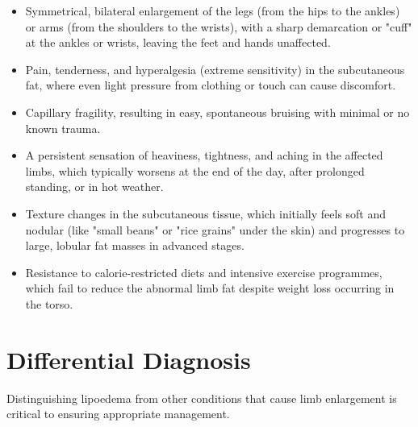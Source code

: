\begin{itemize}
    \item Symmetrical, bilateral enlargement of the legs (from the hips to the ankles) or arms (from the shoulders to the wrists), with a sharp demarcation or "cuff" at the ankles or wrists, leaving the feet and hands unaffected.
    \item Pain, tenderness, and hyperalgesia (extreme sensitivity) in the subcutaneous fat, where even light pressure from clothing or touch can cause discomfort.
    \item Capillary fragility, resulting in easy, spontaneous bruising with minimal or no known trauma.
    \item A persistent sensation of heaviness, tightness, and aching in the affected limbs, which typically worsens at the end of the day, after prolonged standing, or in hot weather.
    \item Texture changes in the subcutaneous tissue, which initially feels soft and nodular (like "small beans" or "rice grains" under the skin) and progresses to large, lobular fat masses in advanced stages.
    \item Resistance to calorie-restricted diets and intensive exercise programmes, which fail to reduce the abnormal limb fat despite weight loss occurring in the torso.
\end{itemize}

\section*{Differential Diagnosis}
Distinguishing lipoedema from other conditions that cause limb enlargement is critical to ensuring appropriate management.

